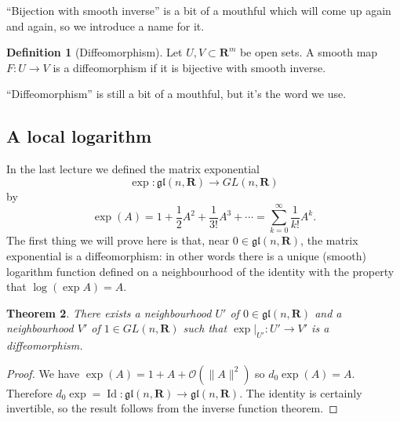 \documentclass[12pt]{article}
\newcommand{\RR}{\mathbf{R}}
\newcommand{\OP}{\operatorname}
\newtheorem{thm}{Theorem}[section]
\theoremstyle{definition}
\newtheorem{dfn}[thm]{Definition}
\theoremstyle{check}
\theoremstyle{remark}
\theoremstyle{TheoremNum}
\begin{document}
``Bijection with smooth inverse'' is a bit of a mouthful which will come up again and again, so we introduce a name for it.

\begin{dfn}[Diffeomorphism]
Let $U,V\subset\RR^m$ be open sets. A smooth map $F\colon U\to V$ is a diffeomorphism if it is bijective with smooth inverse.
\end{dfn}

``Diffeomorphism'' is still a bit of a mouthful, but it's the word we use.


\subsection{A local logarithm}

In the last lecture we defined the matrix exponential
\[\exp\colon\mathfrak{gl}(n,\RR)\to GL(n,\RR)\]
by
\[\exp(A)=1+\frac{1}{2}A^2+\frac{1}{3!}A^3+\cdots=\sum_{k=0}^{\infty}\frac{1}{k!}A^k.\]
The first thing we will prove here is that, near $0\in\mathfrak{gl}(n,\RR)$, the matrix exponential is a diffeomorphism: in other words there is a unique (smooth) logarithm function defined on a neighbourhood of the identity with the property that $\log(\exp A)=A$.

\begin{thm}\label{thm:expdiff}
There exists a neighbourhood $U'$ of $0\in\mathfrak{gl}(n,\RR)$ and a neighbourhood $V'$ of $1\in GL(n,\RR)$ such that $\exp|_{U'}\colon U'\to V'$ is a diffeomorphism.
\end{thm}
\begin{proof}
We have $\exp(A)=1+A+\mathcal{O}(\|A\|^2)$ so $d_0\exp(A)=A$. Therefore $d_0\exp=\OP{Id}\colon\mathfrak{gl}(n,\RR)\to\mathfrak{gl}(n,\RR)$. The identity is certainly invertible, so the result follows from the inverse function theorem.
\end{proof}
\end{document}
